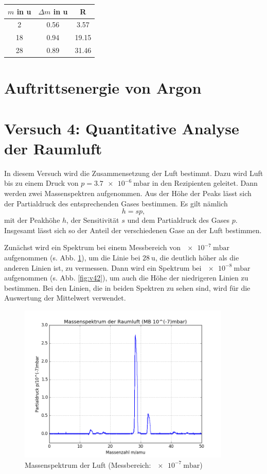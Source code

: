 \begin{tabular}{ccc}
	\toprule
	$m$ in u&$\Delta m$ in u&R\\
	\midrule
	2&0.56&3.57\\
	18&0.94&19.15\\
	28&0.89&31.46\\
	\bottomrule
\end{tabular}


\section{Auftrittsenergie von Argon}

\section{Versuch 4: Quantitative Analyse der Raumluft}

In diesem Versuch wird die Zusammensetzung der Luft bestimmt. Dazu wird Luft bis zu einem Druck von $p=\SI{3,7e-6}{\milli\bar}$ in den Rezipienten geleitet. Dann werden zwei Massenspektren aufgenommen. Aus der Höhe der Peaks lässt sich der Partialdruck des entsprechenden Gases bestimmen. Es gilt nämlich
\begin{equation}
 h = sp,
\end{equation}
mit der Peakhöhe $h$, der Sensitivität $s$ und dem Partialdruck des Gases $p$. Insgesamt lässt sich so der Anteil der verschiedenen Gase an der Luft bestimmen.

Zunächst wird ein Spektrum bei einem Messbereich von $\SI{e-7}{\milli\bar}$ aufgenommen (s. Abb. \ref{fig:v41}), um die Linie bei $\SI{28}{\amu}$, die deutlich höher als die anderen Linien ist, zu vermessen. Dann wird ein Spektrum bei $\SI{e-8}{\milli\bar}$ aufgenommen (s. Abb. \ref{fig:v42}), um auch die Höhe der niedrigeren Linien zu bestimmen.
Bei den Linien, die in beiden Spektren zu sehen sind, wird für die Auswertung der Mittelwert verwendet.

\begin{figure}[tb]
	\centering\includegraphics[width=0.9\textwidth]{fig/a4_1.png}
	\caption{Massenspektrum der Luft (Messbereich: $\SI{e-7}{\milli\bar}$)}
	\label{fig:v41}
\end{figure}

